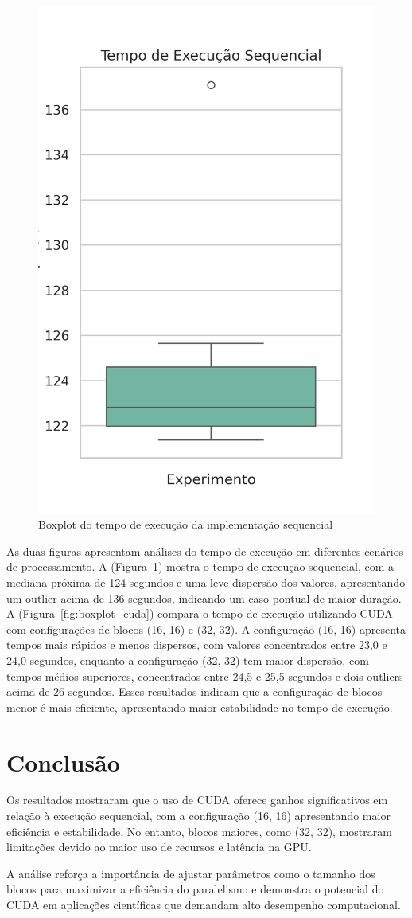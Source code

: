 \documentclass[12pt]{article}
\begin{document}
\begin{figure}[H]
  \centering
  \includegraphics[width=.35\textwidth]{figs/times_boxplot_sequential.png}
  \caption{Boxplot do tempo de execução da implementação sequencial} 
  \label{fig:boxplot_sequential}
\end{figure}

As duas figuras apresentam análises do tempo de execução em diferentes cenários de processamento. A (Figura~\ref{fig:boxplot_sequential}) mostra o tempo de execução sequencial, com a mediana próxima de 124 segundos e uma leve dispersão dos valores, apresentando um outlier acima de 136 segundos, indicando um caso pontual de maior duração. A (Figura~\ref{fig:boxplot_cuda}) compara o tempo de execução utilizando CUDA com configurações de blocos (16, 16) e (32, 32). A configuração (16, 16) apresenta tempos mais rápidos e menos dispersos, com valores concentrados entre 23,0 e 24,0 segundos, enquanto a configuração (32, 32) tem maior dispersão, com tempos médios superiores, concentrados entre 24,5 e 25,5 segundos e dois outliers acima de 26 segundos. Esses resultados indicam que a configuração de blocos menor é mais eficiente, apresentando maior estabilidade no tempo de execução.

\section{Conclusão}
Os resultados mostraram que o uso de CUDA oferece ganhos significativos em relação à execução sequencial, com a configuração (16, 16) apresentando maior eficiência e estabilidade. No entanto, blocos maiores, como (32, 32), mostraram limitações devido ao maior uso de recursos e latência na GPU.

A análise reforça a importância de ajustar parâmetros como o tamanho dos blocos para maximizar a eficiência do paralelismo e demonstra o potencial do CUDA em aplicações científicas que demandam alto desempenho computacional.




\nocite{*}
\end{document}
